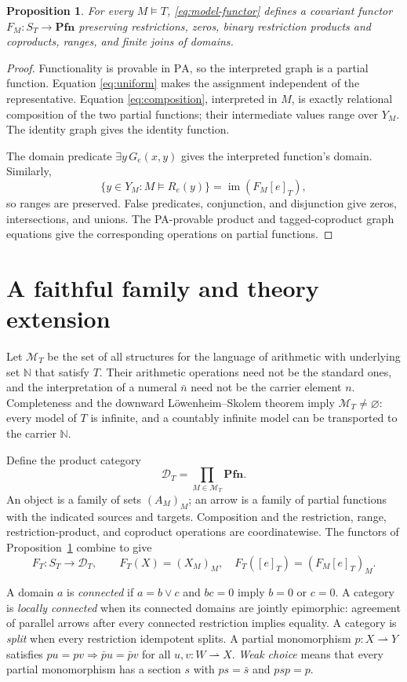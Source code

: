 \documentclass[11pt]{article}
\newtheorem{proposition}[theorem]{Proposition}
\newcommand{\N}{\mathbb N}
\newcommand{\PA}{\mathrm{PA}}
\newcommand{\Pfn}{\mathbf{Pfn}}
\begin{document}
\begin{proposition}\label{prop:model}
For every $M\models T$, \eqref{eq:model-functor} defines a covariant
functor $F_M:S_T\to\Pfn$ preserving restrictions, zeros, binary
restriction products and coproducts, ranges, and finite joins of domains.
\end{proposition}
\begin{proof}
Functionality is provable in $\PA$, so the interpreted graph is a
partial function. Equation \eqref{eq:uniform} makes the assignment
independent of the representative. Equation \eqref{eq:composition},
interpreted in $M$, is exactly relational composition of the two partial
functions; their intermediate values range over $Y_M$. The identity
graph gives the identity function.

The domain predicate $\exists y\,G_e(x,y)$ gives the interpreted
function's domain. Similarly,
\[
 \{y\in Y_M:M\models R_e(y)\}
 =\operatorname{im}(F_M[e]_T),
\]
so ranges are preserved. False predicates, conjunction, and disjunction
give zeros, intersections, and unions. The PA-provable product and
tagged-coproduct graph equations give the corresponding operations on
partial functions.
\end{proof}

\section{A faithful family and theory extension}\label{sec:family}

Let $\mathcal M_T$ be the set of all structures for the language of
arithmetic with underlying set $\N$ that satisfy $T$. Their arithmetic
operations need not be the standard ones, and the interpretation of a
numeral $\bar n$ need not be the carrier element $n$. Completeness and
the downward L\"owenheim--Skolem theorem imply
$\mathcal M_T\ne\varnothing$: every model of $T$ is infinite, and a
countably infinite model can be transported to the carrier $\N$.

Define the product category
\[
 \mathcal D_T=\prod_{M\in\mathcal M_T}\Pfn.
\]
An object is a family of sets $(A_M)_M$; an arrow is a family of partial
functions with the indicated sources and targets. Composition and the
restriction, range, restriction-product, and coproduct operations are coordinatewise.
The functors of Proposition~\ref{prop:model} combine to give
\[
 F_T:S_T\longrightarrow\mathcal D_T,\qquad
 F_T(X)=(X_M)_M,\quad F_T([e]_T)=(F_M[e]_T)_M.
\]

A domain $a$ is \emph{connected} if $a=b\vee c$ and $bc=0$ imply
$b=0$ or $c=0$. A category is \emph{locally connected} when its connected
domains are jointly epimorphic: agreement of parallel arrows after every
connected restriction implies equality. A category is \emph{split} when
every restriction idempotent splits. A partial monomorphism
$p:X\rightharpoonup Y$ satisfies
$pu=pv\Rightarrow\bar p u=\bar p v$ for all $u,v:W\rightharpoonup X$.
\emph{Weak choice} means that
every partial monomorphism has a section $s$ with
$ps=\bar s$ and $psp=p$.
\end{document}
